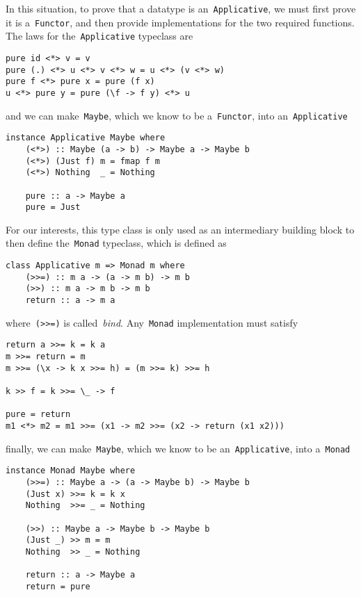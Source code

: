\documentclass[../TFG.tex]{subfiles}
\begin{document}
In this situation, to prove that a datatype is
an~\texttt{Applicative}, we must first prove it is
a~\texttt{Functor}, and then provide implementations for the two
required functions.
The laws for the~\texttt{Applicative} typeclass are
\begin{verbatim}
pure id <*> v = v
pure (.) <*> u <*> v <*> w = u <*> (v <*> w)
pure f <*> pure x = pure (f x)
u <*> pure y = pure (\f -> f y) <*> u
\end{verbatim}
and we can make~\texttt{Maybe}, which we know to be
a~\texttt{Functor}, into an~\texttt{Applicative}
\begin{verbatim}
instance Applicative Maybe where
    (<*>) :: Maybe (a -> b) -> Maybe a -> Maybe b
    (<*>) (Just f) m = fmap f m
    (<*>) Nothing  _ = Nothing

    pure :: a -> Maybe a
    pure = Just
\end{verbatim}
For our interests, this type class is only used as an intermediary building
block to then define the~\texttt{Monad} typeclass, which is defined
as
\begin{verbatim}
class Applicative m => Monad m where
    (>>=) :: m a -> (a -> m b) -> m b
    (>>) :: m a -> m b -> m b
    return :: a -> m a
\end{verbatim}
where~\texttt{(>>=)} is called~\emph{bind}.
Any~\texttt{Monad} implementation must satisfy
\begin{verbatim}
return a >>= k = k a
m >>= return = m
m >>= (\x -> k x >>= h) = (m >>= k) >>= h

k >> f = k >>= \_ -> f

pure = return
m1 <*> m2 = m1 >>= (x1 -> m2 >>= (x2 -> return (x1 x2)))
\end{verbatim}
finally, we can make~\texttt{Maybe}, which we know to be
an~\texttt{Applicative}, into a~\texttt{Monad}
\begin{verbatim}
instance Monad Maybe where
    (>>=) :: Maybe a -> (a -> Maybe b) -> Maybe b
    (Just x) >>= k = k x
    Nothing  >>= _ = Nothing

    (>>) :: Maybe a -> Maybe b -> Maybe b
    (Just _) >> m = m
    Nothing  >> _ = Nothing

    return :: a -> Maybe a
    return = pure
\end{verbatim}
\end{document}
